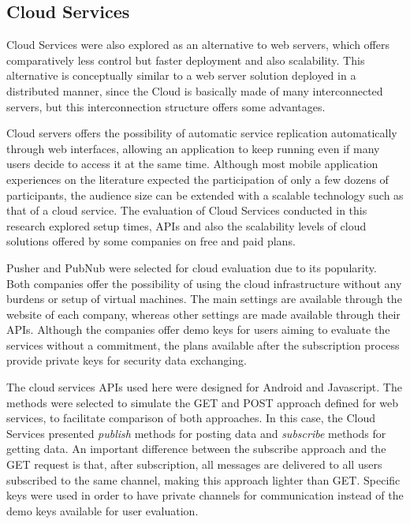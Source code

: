 \subsection*{Cloud Services}

Cloud Services were also explored as an alternative to web servers, which offers comparatively less control but faster deployment and also scalability.
This alternative is conceptually similar to a web server solution deployed in a distributed manner, since the Cloud is basically made of many interconnected servers, but this interconnection structure offers some advantages. 

Cloud servers offers the possibility of automatic service replication automatically through web interfaces, allowing an application to keep running even if many users decide to access it at the same time.
Although most mobile application experiences on the literature expected the participation of only a few dozens of participants, the audience size can be extended with a scalable technology such as that of a cloud service.
The evaluation of Cloud Services conducted in this research explored setup times, APIs and also the scalability levels of cloud solutions offered by some companies on free and paid plans. 

Pusher and PubNub were selected for cloud evaluation due to its popularity.
Both companies offer the possibility of using the cloud infrastructure without any burdens or setup of virtual machines.
The main settings are available through the website of each company, whereas other settings are made available through their APIs.
Although the companies offer demo keys for users aiming to evaluate the services without a commitment, the plans available after the subscription process provide private keys for security data exchanging. 

The cloud services APIs used here were designed for Android and Javascript.
The methods were selected to simulate the GET and POST approach defined for web services, to facilitate comparison of both approaches.
In this case, the Cloud Services presented \emph{publish} methods for posting data and \emph{subscribe} methods for getting data.
An important difference between the subscribe approach and the GET request is that, after subscription, all messages are delivered to all users subscribed to the same channel, making this approach lighter than GET. 
Specific keys were used in order to have private channels for communication instead of the demo keys available for user evaluation.

